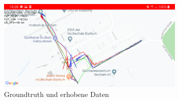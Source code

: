 \begin{figure}[h!]
    \centering
    \includegraphics[width=0.8\textwidth]{screenshot_routen_map}
    \caption{Groundtruth und erhobene Daten}
    \label{fig:map}
\end{figure}
	
